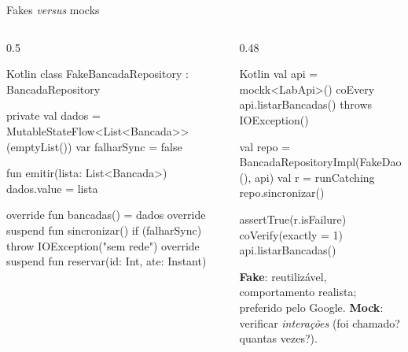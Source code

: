 \documentclass[aspectratio=169,10pt]{beamer}
\begin{document}
\begin{frame}[fragile]{Fakes \emph{versus} mocks}
  \begin{columns}[T]
    \begin{column}{0.5\textwidth}
\begin{codigo}[title=Fake: implementação simples]{Kotlin}
class FakeBancadaRepository : BancadaRepository {
  private val dados =
    MutableStateFlow<List<Bancada>>(emptyList())
  var falharSync = false

  fun emitir(lista: List<Bancada>) { dados.value = lista }

  override fun bancadas() = dados
  override suspend fun sincronizar() {
    if (falharSync) throw IOException("sem rede")
  }
  override suspend fun reservar(id: Int, ate: Instant) {}
}
\end{codigo}
    \end{column}
    \begin{column}{0.48\textwidth}
\begin{codigo}[title=Mock com MockK]{Kotlin}
val api = mockk<LabApi>()
coEvery { api.listarBancadas() } throws IOException()

val repo = BancadaRepositoryImpl(FakeDao(), api)
val r = runCatching { repo.sincronizar() }

assertTrue(r.isFailure)
coVerify(exactly = 1) { api.listarBancadas() }
\end{codigo}
      \begin{conceito}
        \textbf{Fake}: reutilizável, comportamento realista; preferido pelo Google. \textbf{Mock}: verificar \emph{interações} (foi chamado? quantas vezes?).
      \end{conceito}
    \end{column}
  \end{columns}
\end{frame}
\end{document}
